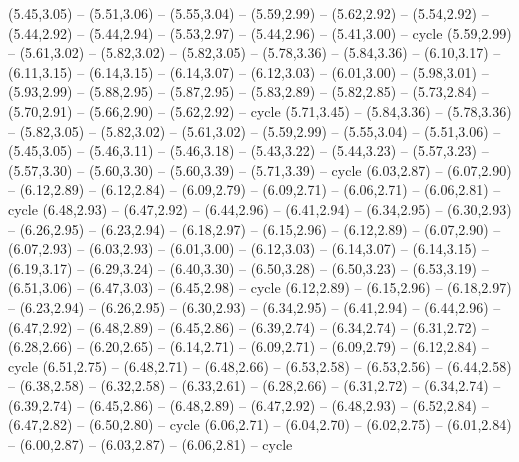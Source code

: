\expandafter\def\csname geo:gebiet:SEN\endcsname{
  (5.45,3.05) -- (5.51,3.06) -- (5.55,3.04) -- (5.59,2.99) -- (5.62,2.92) -- (5.54,2.92) -- (5.44,2.92) -- (5.44,2.94) -- (5.53,2.97) -- (5.44,2.96) -- (5.41,3.00) -- cycle}
\expandafter\def\csname geo:gebiet:MLI\endcsname{
  (5.59,2.99) -- (5.61,3.02) -- (5.82,3.02) -- (5.82,3.05) -- (5.78,3.36) -- (5.84,3.36) -- (6.10,3.17) -- (6.11,3.15) -- (6.14,3.15) -- (6.14,3.07) -- (6.12,3.03) -- (6.01,3.00) -- (5.98,3.01) -- (5.93,2.99) -- (5.88,2.95) -- (5.87,2.95) -- (5.83,2.89) -- (5.82,2.85) -- (5.73,2.84) -- (5.70,2.91) -- (5.66,2.90) -- (5.62,2.92) -- cycle}
\expandafter\def\csname geo:gebiet:MRT\endcsname{
  (5.71,3.45) -- (5.84,3.36) -- (5.78,3.36) -- (5.82,3.05) -- (5.82,3.02) -- (5.61,3.02) -- (5.59,2.99) -- (5.55,3.04) -- (5.51,3.06) -- (5.45,3.05) -- (5.46,3.11) -- (5.46,3.18) -- (5.43,3.22) -- (5.44,3.23) -- (5.57,3.23) -- (5.57,3.30) -- (5.60,3.30) -- (5.60,3.39) -- (5.71,3.39) -- cycle}
\expandafter\def\csname geo:gebiet:BEN\endcsname{
  (6.03,2.87) -- (6.07,2.90) -- (6.12,2.89) -- (6.12,2.84) -- (6.09,2.79) -- (6.09,2.71) -- (6.06,2.71) -- (6.06,2.81) -- cycle}
\expandafter\def\csname geo:gebiet:NER\endcsname{
  (6.48,2.93) -- (6.47,2.92) -- (6.44,2.96) -- (6.41,2.94) -- (6.34,2.95) -- (6.30,2.93) -- (6.26,2.95) -- (6.23,2.94) -- (6.18,2.97) -- (6.15,2.96) -- (6.12,2.89) -- (6.07,2.90) -- (6.07,2.93) -- (6.03,2.93) -- (6.01,3.00) -- (6.12,3.03) -- (6.14,3.07) -- (6.14,3.15) -- (6.19,3.17) -- (6.29,3.24) -- (6.40,3.30) -- (6.50,3.28) -- (6.50,3.23) -- (6.53,3.19) -- (6.51,3.06) -- (6.47,3.03) -- (6.45,2.98) -- cycle}
\expandafter\def\csname geo:gebiet:NGA\endcsname{
  (6.12,2.89) -- (6.15,2.96) -- (6.18,2.97) -- (6.23,2.94) -- (6.26,2.95) -- (6.30,2.93) -- (6.34,2.95) -- (6.41,2.94) -- (6.44,2.96) -- (6.47,2.92) -- (6.48,2.89) -- (6.45,2.86) -- (6.39,2.74) -- (6.34,2.74) -- (6.31,2.72) -- (6.28,2.66) -- (6.20,2.65) -- (6.14,2.71) -- (6.09,2.71) -- (6.09,2.79) -- (6.12,2.84) -- cycle}
\expandafter\def\csname geo:gebiet:CMR\endcsname{
  (6.51,2.75) -- (6.48,2.71) -- (6.48,2.66) -- (6.53,2.58) -- (6.53,2.56) -- (6.44,2.58) -- (6.38,2.58) -- (6.32,2.58) -- (6.33,2.61) -- (6.28,2.66) -- (6.31,2.72) -- (6.34,2.74) -- (6.39,2.74) -- (6.45,2.86) -- (6.48,2.89) -- (6.47,2.92) -- (6.48,2.93) -- (6.52,2.84) -- (6.47,2.82) -- (6.50,2.80) -- cycle}
\expandafter\def\csname geo:gebiet:TGO\endcsname{
  (6.06,2.71) -- (6.04,2.70) -- (6.02,2.75) -- (6.01,2.84) -- (6.00,2.87) -- (6.03,2.87) -- (6.06,2.81) -- cycle}
